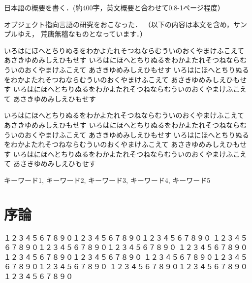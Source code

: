 \documentclass{funthesis}
\begin{document}
\begin{jabstract}
日本語の概要を書く．(約400字，英文概要と合わせて0.8-1ページ程度）

オブジェクト指向言語の研究をおこなった．
（以下の内容は本文を含め，サンプルゆえ，
荒唐無稽なものとなっています．）

いろはにほへとちりぬるをわかよたれそつねならむういのおくやまけふこえて
あさきゆめみしえひもせす
いろはにほへとちりぬるをわかよたれそつねならむういのおくやまけふこえて
あさきゆめみしえひもせす
いろはにほへとちりぬるをわかよたれそつねならむういのおくやまけふこえて
あさきゆめみしえひもせす
いろはにほへとちりぬるをわかよたれそつねならむういのおくやまけふこえて
あさきゆめみしえひもせす

いろはにほへとちりぬるをわかよたれそつねならむういのおくやまけふこえて
あさきゆめみしえひもせす
いろはにほへとちりぬるをわかよたれそつねならむういのおくやまけふこえて
あさきゆめみしえひもせす
いろはにほへとちりぬるをわかよたれそつねならむういのおくやまけふこえて
あさきゆめみしえひもせす
いろはにほへとちりぬるをわかよたれそつねならむういのおくやまけふこえて
あさきゆめみしえひもせす

\end{jabstract}

\begin{jkeyword}
キーワード1, キーワード2, キーワード3, キーワード4, キーワード5
\end{jkeyword}

\tableofcontents %


\chapter{序論} %

１２３４５６７８９０１２３４５６７８９０１２３４５６７８９０
１２３４５６７８９０１２３４５６７８９０１２３４５６７８９０
１２３４５６７８９０１２３４５６７８９０１２３４５６７８９０
１２３４５６７８９０１２３４５６７８９０１２３４５６７８９０
１２３４５６７８９０１２３４５６７８９０１２３４５６７８９０
\end{document}
